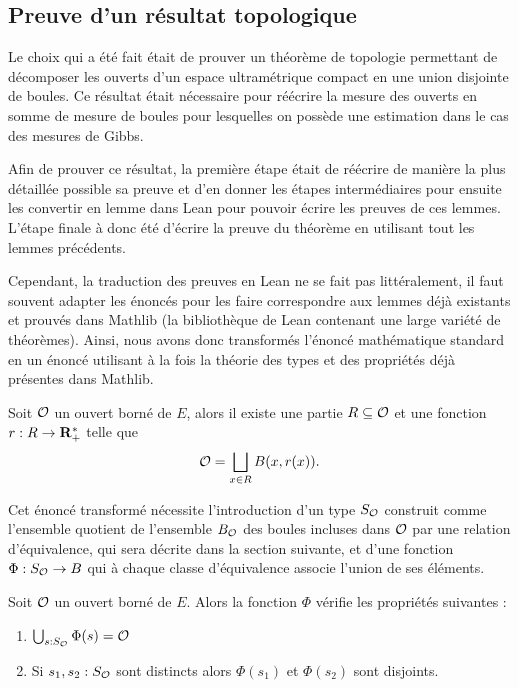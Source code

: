 \documentclass[../../rapport.tex]{subfiles}
\begin{document}
  \subsection{Preuve d'un résultat topologique}

  Le choix qui a été fait était de prouver un théorème de topologie permettant de décomposer les ouverts d'un espace ultramétrique compact
  en une union disjointe de boules.
  Ce résultat était nécessaire pour réécrire la mesure des ouverts en somme de mesure de boules pour lesquelles on possède une estimation
  dans le cas des mesures de Gibbs.

  Afin de prouver ce résultat, la première étape était de réécrire de manière la plus détaillée possible sa preuve et d'en donner
  les étapes intermédiaires pour ensuite les convertir en lemme dans Lean pour pouvoir écrire les preuves de ces lemmes.
  L'étape finale à donc été d'écrire la preuve du théorème en utilisant tout les lemmes précédents.

  Cependant, la traduction des preuves en Lean ne se fait pas littéralement, il faut souvent adapter les énoncés pour
  les faire correspondre aux lemmes déjà existants et prouvés dans Mathlib (la bibliothèque de Lean contenant une large variété de théorèmes).
  Ainsi, nous avons donc transformés l'énoncé mathématique standard %
  en un énoncé utilisant à la fois la théorie des types et des propriétés déjà présentes dans Mathlib.
  \begin{theorem*}
    Soit $\mathcal{O}$ un ouvert borné de $E$, alors il existe une partie $R \subseteq \mathcal{O}$ et une fonction $r : R \rightarrow \mathbf R^*_+$ telle que
    $$\mathcal{O} = \bigsqcup_{x \in R}{B(x, r(x))}.$$
  \end{theorem*}
  Cet énoncé transformé nécessite l'introduction d'un type $S_{\mathcal{O}}$
  construit comme l'ensemble quotient de l'ensemble $B_{\mathcal{O}}$ des boules incluses dans $\mathcal{O}$
  par une relation d'équivalence, qui sera décrite dans la section suivante,
  et d'une fonction $\Phi : S_{\mathcal{O}} \rightarrow B$ qui à chaque classe d'équivalence associe l'union de ses éléments.

  \begin{theorem*}
    Soit $\mathcal{O}$ un ouvert borné de $E$. Alors la fonction $\Phi$ vérifie les propriétés suivantes :
    \begin{enumerate}
      \item $\bigcup_{s : S_{\mathcal{O}}}{\Phi(s)} = \mathcal{O}$
      \item Si $s_1, s_2 : S_{\mathcal{O}}$ sont distincts alors $\Phi(s_1)$ et $\Phi(s_2)$ sont disjoints.
    \end{enumerate}
  \end{theorem*}
\end{document}
